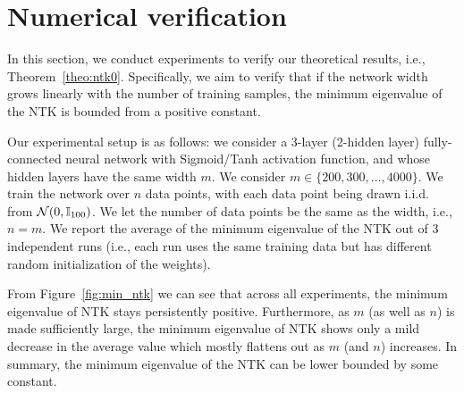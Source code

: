 \section{Numerical verification}\label{sec:exp}

In this section, we conduct experiments to verify our theoretical results, i.e., Theorem~\ref{theo:ntk0}. Specifically,  we aim to verify that if the network width grows linearly with the number of training samples, the minimum eigenvalue of the NTK is bounded from a positive constant. 

Our experimental setup is as follows: we consider a 3-layer (2-hidden layer) fully-connected neural network with Sigmoid/Tanh activation function, and whose hidden layers have the same width $m$. We consider $m \in \{200, 300,..., 4000\}$. We train the network over $n$ data points, with each data point being drawn i.i.d. from $\mathcal{N}(0,\mathbb{I}_{100})$. We let the number of data points be the same as the width, i.e., $n=m$. We report the average of the minimum eigenvalue of the NTK out of 3 independent runs (i.e., each run uses the same training data but has different random initialization of the weights).

From Figure~\ref{fig:min_ntk} we can see that across all experiments, the minimum eigenvalue of NTK stays persistently positive. Furthermore, as $m$ (as well as $n$) is made sufficiently large, the minimum eigenvalue of NTK shows only a mild decrease in the average value which mostly flattens out as $m$ (and $n$) increases. In summary, the minimum eigenvalue of the NTK can be lower bounded by some constant. 



